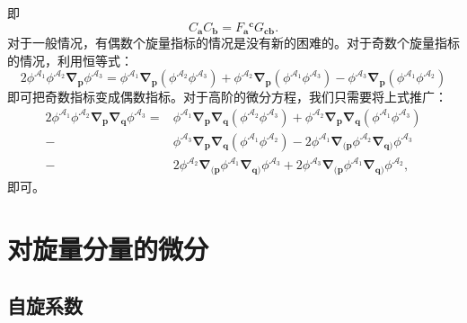 即
\begin{equation}
	C_{\boldsymbol{a}} C_{\boldsymbol{b}} =F{_{\boldsymbol{a}}}^{\boldsymbol{c}} G_{\boldsymbol{cb}} .
	\label{eq:5.41}
\end{equation}
对于一般情况，有偶数个旋量指标的情况是没有新的困难的。对于奇数个旋量指标的情况，利用恒等式：
\begin{equation*}
	2\phi ^{\mathcal{A}_{1}} \phi ^{\mathcal{A}_{2}}\boldsymbol{\nabla }_{\boldsymbol{p}} \phi ^{\mathcal{A}_{3}} =\phi ^{\mathcal{A}_{1}}\boldsymbol{\nabla }_{\boldsymbol{p}} (\phi ^{\mathcal{A}_{2}} \phi ^{\mathcal{A}_{3}} )+\phi ^{\mathcal{A}_{2}}\boldsymbol{\nabla }_{\boldsymbol{p}} (\phi ^{\mathcal{A}_{1}} \phi ^{\mathcal{A}_{3}} )-\phi ^{\mathcal{A}_{3}}\boldsymbol{\nabla }_{\boldsymbol{p}} (\phi ^{\mathcal{A}_{1}} \phi ^{\mathcal{A}_{2}} )
\end{equation*}
即可把奇数指标变成偶数指标。对于高阶的微分方程，我们只需要将上式推广：
\begin{equation*}
	\begin{aligned}
		2\phi ^{\mathcal{A}_{1}} \phi ^{\mathcal{A}_{2}}\boldsymbol{\nabla }_{\boldsymbol{p}}\boldsymbol{\nabla }_{\boldsymbol{q}} \phi ^{\mathcal{A}_{3}} = & \phi ^{\mathcal{A}_{1}}\boldsymbol{\nabla }_{\boldsymbol{p}}\boldsymbol{\nabla }_{\boldsymbol{q}} (\phi ^{\mathcal{A}_{2}} \phi ^{\mathcal{A}_{3}} )+\phi ^{\mathcal{A}_{2}}\boldsymbol{\nabla }_{\boldsymbol{p}}\boldsymbol{\nabla }_{\boldsymbol{q}} (\phi ^{\mathcal{A}_{1}} \phi ^{\mathcal{A}_{3}} )\\
		- & \phi ^{\mathcal{A}_{3}}\boldsymbol{\nabla }_{\boldsymbol{p}}\boldsymbol{\nabla }_{\boldsymbol{q}} (\phi ^{\mathcal{A}_{1}} \phi ^{\mathcal{A}_{2}} )-2\phi ^{\mathcal{A}_{1}}\boldsymbol{\nabla }_{(\boldsymbol{p}} \phi ^{\mathcal{A}_{2}}\boldsymbol{\nabla }_{\boldsymbol{q} )} \phi ^{\mathcal{A}_{3}}\\
		- & 2\phi ^{\mathcal{A}_{2}}\boldsymbol{\nabla }_{(\boldsymbol{p}} \phi ^{\mathcal{A}_{1}}\boldsymbol{\nabla }_{\boldsymbol{q} )} \phi ^{\mathcal{A}_{3}} +2\phi ^{\mathcal{A}_{3}}\boldsymbol{\nabla }_{(\boldsymbol{p}} \phi ^{\mathcal{A}_{1}}\boldsymbol{\nabla }_{\boldsymbol{q} )} \phi ^{\mathcal{A}_{2}} ,
	\end{aligned}
\end{equation*}
即可。


\section{对旋量分量的微分}
\subsection{自旋系数}

